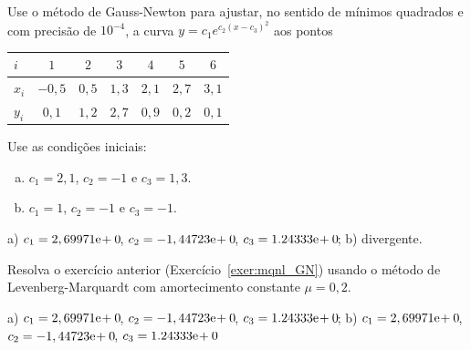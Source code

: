 \begin{exer}\label{exer:mqnl_GN}
  Use o método de Gauss-Newton para ajustar, no sentido de mínimos quadrados e com precisão de $10^{-4}$, a curva $y = c_1e^{c_2(x-c_3)^2}$ aos pontos
  \begin{center}
    \begin{tabular}{l|cccccc}
      $i$ & $1$ & $2$ & $3$ & $4$ & $5$ & $6$ \\\hline
      $x_i$ & $-0,5$ & $0,5$ & $1,3$ & $2,1$ & $2,7$ & $3,1$ \\
      $y_i$ & $0,1$ & $1,2$ & $2,7$ & $0,9$ & $0,2$ & $0,1$ \\\hline
    \end{tabular}
  \end{center}
Use as condições iniciais:
\begin{enumerate}[a)]
\item $c_1 = 2,1$, $c_2=-1$ e $c_3=1,3$.
\item $c_1=1$, $c_2=-1$ e $c_3=-1$.
\end{enumerate}
\end{exer}
\begin{resp}
  a) $c_1 = 2,69971\mathrm{e}\!+0\!$, $c_2 = -1,44723\mathrm{e}\!+0\!$, $c_3 = 1.24333\mathrm{e}\!+0\!$; b) divergente.
\end{resp}

\begin{exer}
  Resolva o exercício anterior (Exercício~\ref{exer:mqnl_GN}) usando o método de Levenberg-Marquardt com amortecimento constante $\mu=0,2$.
\end{exer}
\begin{resp}
  a)  $c_1 = 2,69971\mathrm{e}\!+0\!$, $c_2 = -1,44723\mathrm{e}\!+0\!$, $c_3 = 1.24333\mathrm{e}\!+0\!$; b) $c_1 = 2,69971\mathrm{e}\!+0\!$, $c_2 = -1,44723\mathrm{e}\!+0\!$, $c_3 = 1.24333\mathrm{e}\!+0\!$
\end{resp}
